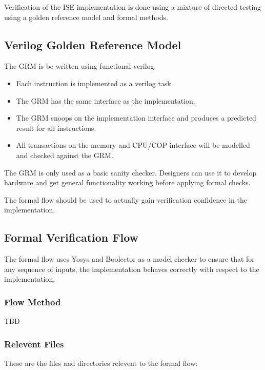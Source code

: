 
Verification of the ISE implementation is done using a mixture of
directed testing using a golden reference model and formal methods.

\subsection{Verilog Golden Reference Model}

The GRM is be written using functional verilog.

\begin{itemize}
\item Each instruction is implemented as a verilog task.
\item The GRM has the same interface as the implementation.
\item The GRM snoops on the implementation interface and produces a
    predicted result for all instructions.
\item All transactions on the memory and CPU/COP interface will be modelled
    and checked against the GRM.
\end{itemize}

The GRM is only used as a basic sanity checker. Designers can use it to
develop hardware and get general functionality working before applying
formal checks.

The formal flow should be used to actually gain verification confidence
in the implementation.

\subsection{Formal Verification Flow}

The formal flow uses Yosys and Boolector as a model checker to ensure that
for any sequence of inputs, the implementation behaves correctly with
respect to the implementation.


\subsubsection{Flow Method}

TBD

\subsubsection{Relevent Files}

These are the files and directories relevent to the formal flow:


